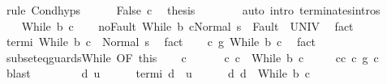 \begin{isabellebody}
\ {\isacharparenleft}rule\ Cond{\isachardot}hyps{\isacharparenright}\isanewline
\ \ \ \ \isamarkupfalse%
\ False\ c\ \isamarkupfalse%
\ {\isacharquery}thesis\isanewline
\ \ \ \ \ \ \isamarkupfalse%
\ {\isacharparenleft}auto\ intro{\isacharcolon}\ terminates{\isachardot}intros{\isacharparenright}\isanewline
\ \ \isamarkupfalse%
\isanewline
{}\isamarkupfalse%
\isanewline
\ \ \isamarkupfalse%
\ {\isacharparenleft}While\ b\ c{\isacharprime}{\isacharparenright}\isanewline
\ \ \isamarkupfalse%
\ noFault{\isacharcolon}\ {\isachardoublequoteopen}{\isasymGamma}{\isasymturnstile}{\isasymlangle}While\ b\ c{\isacharprime}{\isacharcomma}Normal\ s\ {\isasymrangle}\ {\isasymRightarrow}{\isasymnotin}Fault\ {\isacharbackquote}\ UNIV{\isachardoublequoteclose}\ \isamarkupfalse%
\ fact\isanewline
\ \ \isamarkupfalse%
\ termi{\isacharcolon}\ {\isachardoublequoteopen}{\isasymGamma}{\isasymturnstile}While\ b\ c{\isacharprime}\ {\isasymdown}\ Normal\ s{\isachardoublequoteclose}\ \isamarkupfalse%
\ fact\isanewline
\ \ \isamarkupfalse%
\ {\isachardoublequoteopen}c\ {\isasymsubseteq}\isactrlsub g\ While\ b\ c{\isacharprime}{\isachardoublequoteclose}\ \isamarkupfalse%
\ fact\isanewline
\ \ \isamarkupfalse%
\ subseteq{\isacharunderscore}guards{\isacharunderscore}While\ {\isacharbrackleft}OF\ this{\isacharbrackright}\isanewline
\ \ \isamarkupfalse%
\ c{\isacharprime}{\isacharprime}\ \ \isanewline
\ \ \ \ c{\isacharcolon}\ {\isachardoublequoteopen}c\ {\isacharequal}\ While\ b\ c{\isacharprime}{\isacharprime}{\isachardoublequoteclose}\ \isanewline
\ \ \ \ c{\isacharprime}{\isacharprime}{\isacharunderscore}c{\isacharprime}{\isacharcolon}\ {\isachardoublequoteopen}c{\isacharprime}{\isacharprime}\ {\isasymsubseteq}\isactrlsub g\ c{\isacharprime}{\isachardoublequoteclose}\isanewline
\ \ \ \ \isamarkupfalse%
\ blast\isanewline
\ \ \isacommand{{\isacharbraceleft}}\isamarkupfalse%
\isanewline
\ \ \ \ \isamarkupfalse%
\ d\ u\isanewline
\ \ \ \ \isamarkupfalse%
\ termi{\isacharcolon}\ {\isachardoublequoteopen}{\isasymGamma}{\isasymturnstile}d\ {\isasymdown}\ u{\isachardoublequoteclose}\isanewline
\ \ \ \ \isamarkupfalse%
\ d{\isacharcolon}\ {\isachardoublequoteopen}d\ {\isacharequal}\ While\ b\ c{\isacharprime}{\isachardoublequoteclose}\isanewline
\ \ \ \ \isamarkupfalse%

\end{isabellebody}
